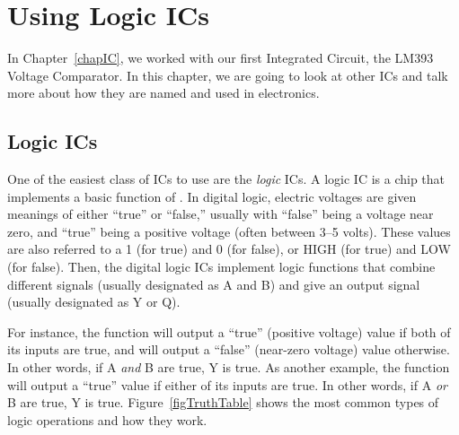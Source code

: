 \chapter{Using Logic ICs}
\label{chapLogicICs}

In Chapter~\ref{chapIC}, we worked with our first Integrated Circuit, the LM393 Voltage Comparator.  
In this chapter, we are going to look at other ICs and talk more about how they are named and used in electronics.

\section{Logic ICs}

One of the easiest class of ICs to use are the \emph{logic} ICs.  
A logic IC is a chip that implements a basic function of .
In digital logic, electric voltages are given meanings of either ``true'' or ``false,'' usually with ``false'' being a voltage near zero, and ``true'' being a positive voltage (often between 3--5 volts).
These values are also referred to a 1 (for true) and 0 (for false), or HIGH (for true) and LOW (for false).
Then, the digital logic ICs implement logic functions that combine different signals (usually designated as A and B) and give an output signal (usually designated as Y or Q).

For instance, the  function will output a ``true'' (positive voltage) value if both of its inputs are true, and will output a ``false'' (near-zero voltage) value otherwise.  
In other words, if A \emph{and} B are true, Y is true.
As another example, the  function will output a ``true'' value if either of its inputs are true.
In other words, if A \emph{or} B are true, Y is true.
Figure~\ref{figTruthTable} shows the most common types of logic operations and how they work.

